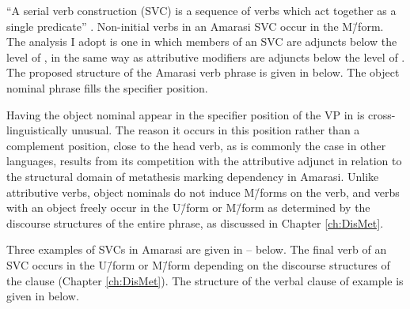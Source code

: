 ``A serial verb construction (SVC) is a sequence of verbs which
act together as a single predicate'' \citep[1]{ai06}.
Non-initial verbs in an Amarasi SVC occur in the M\=/form.
The analysis I adopt is one in which members of an SVC
are adjuncts below the level of , in the same way
as attributive modifiers are adjuncts below the level of .
The proposed structure of the Amarasi verb phrase is given in  below.
The object nominal phrase fills the specifier position.

\begin{exe}
		\label{tr:VerPhr 2}
\end{exe}

Having the object nominal appear in the specifier position of the VP
in  is cross-linguistically unusual.
The reason it occurs in this position rather than a complement position,
close to the head verb, as is commonly the case in other languages,
results from its competition with the attributive adjunct in relation
to the structural domain of metathesis marking dependency in Amarasi.
Unlike attributive verbs, object nominals do not induce M\=/forms on the verb,
and verbs with an object freely occur in the U\=/form or M\=/form as determined by the discourse
structures of the entire phrase, as discussed in Chapter \ref{ch:DisMet}.

Three examples of SVCs in Amarasi are given in -- below.
The final verb of an SVC occurs in the U\=/form or M\=/form depending on the discourse
structures of the clause (Chapter \ref{ch:DisMet}).
The structure of the verbal clause of example 
is given in  below.

